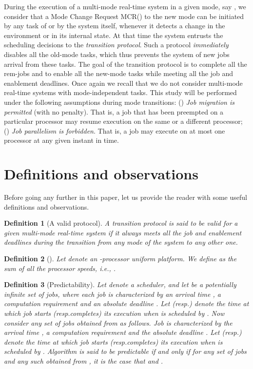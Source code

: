 \documentclass[10pt,english,a4paper]{article}
\newtheorem{definition}{\bf Definition}
\newtheorem{validity test}{Validity Test}
\begin{document}
During the execution of a multi-mode real-time system in a given mode, say , we consider that a Mode Change Request MCR() to the new mode  can be initiated by any task of  or by the system itself, whenever it detects a change in the environment or in its internal state. At that time the system entrusts the scheduling decisions to the {\em transition protocol}. Such a protocol {\em immediately} disables all the old-mode tasks, which thus prevents the system of new jobs arrival from these tasks. The goal of the transition protocol is to complete all the rem-jobs and to enable all the new-mode tasks while meeting all the job and enablement deadlines. Once again we recall that we do not consider multi-mode real-time systems with mode-independent tasks. This study will be performed under the following assumptions during mode transitions: () {\em Job migration is permitted} (with no penalty). That is, a job that has been preempted on a particular processor may resume execution on the same or a different processor; () {\em Job parallelism is forbidden}. That is, a job may execute on at most one processor at any given instant in time.

\section{Definitions and observations}
\label{Definitions and observations}

Before going any further in this paper, let us provide the reader with some useful definitions and observations. 

\begin{definition}[A valid protocol] 
A transition protocol is said to be {\em valid} for a given multi-mode real-time system if it always meets all the job and enablement deadlines during the transition from any mode of the system to any other one.  
\end{definition}

\begin{definition}[]
Let  denote an -processor uniform platform. We define  as the sum of all the processor speeds, i.e., .
\end{definition}

\begin{definition}[Predictability]
Let  denote a scheduler, and let  be a potentially infinite set of jobs, where each job  is characterized by an arrival time , a computation requirement  and an absolute deadline . Let  (resp.\@\:) denote the time at which job  starts (resp.\@\:completes) its execution when  is scheduled by . Now consider any set  of jobs obtained from  as follows. Job  is characterized by the arrival time , a computation requirement  and the absolute deadline . Let  (resp.\@\:) denote the time at which job  starts (resp.\@\:completes) its execution when  is scheduled by . Algorithm  is said to be {\em predictable} if and only if for any set of jobs  and any such  obtained from , it is the case that  and . 
\end{definition}
\end{document}
